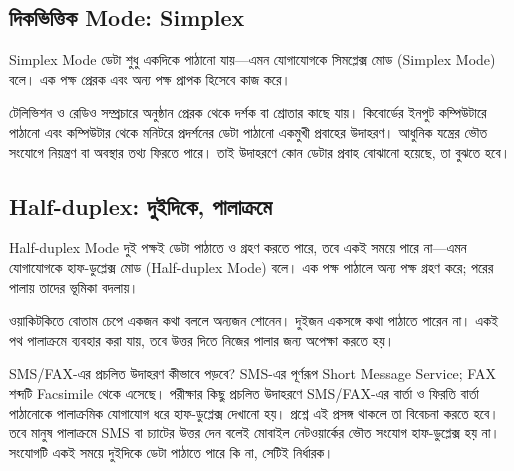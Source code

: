 \subsection{দিকভিত্তিক Mode: Simplex}
\label{ch2:c02-08}
\begin{definitionbox}{Simplex Mode}
ডেটা শুধু একদিকে পাঠানো যায়—এমন যোগাযোগকে সিমপ্লেক্স মোড (Simplex Mode) বলে। এক পক্ষ প্রেরক এবং অন্য পক্ষ প্রাপক হিসেবে কাজ করে।
\end{definitionbox}
টেলিভিশন ও রেডিও সম্প্রচারে অনুষ্ঠান প্রেরক থেকে দর্শক বা শ্রোতার কাছে যায়। কিবোর্ডের ইনপুট কম্পিউটারে পাঠানো এবং কম্পিউটার থেকে মনিটরে প্রদর্শনের ডেটা পাঠানো একমুখী প্রবাহের উদাহরণ। আধুনিক যন্ত্রের ভৌত সংযোগে নিয়ন্ত্রণ বা অবস্থার তথ্য ফিরতে পারে। তাই উদাহরণে কোন ডেটার প্রবাহ বোঝানো হয়েছে, তা বুঝতে হবে।

\subsection{Half-duplex: দুইদিকে, পালাক্রমে}
\label{ch2:c02-09}
\begin{definitionbox}{Half-duplex Mode}
দুই পক্ষই ডেটা পাঠাতে ও গ্রহণ করতে পারে, তবে একই সময়ে পারে না—এমন যোগাযোগকে হাফ-ডুপ্লেক্স মোড (Half-duplex Mode) বলে। এক পক্ষ পাঠালে অন্য পক্ষ গ্রহণ করে; পরের পালায় তাদের ভূমিকা বদলায়।
\end{definitionbox}
ওয়াকিটকিতে বোতাম চেপে একজন কথা বললে অন্যজন শোনেন। দুইজন একসঙ্গে কথা পাঠাতে পারেন না। একই পথ পালাক্রমে ব্যবহার করা যায়, তবে উত্তর দিতে নিজের পালার জন্য অপেক্ষা করতে হয়।
\begin{boardbox}{SMS/FAX-এর প্রচলিত উদাহরণ কীভাবে পড়বে?}
SMS-এর পূর্ণরূপ Short Message Service; FAX শব্দটি Facsimile থেকে এসেছে। পরীক্ষার কিছু প্রচলিত উদাহরণে SMS/FAX-এর বার্তা ও ফিরতি বার্তা পাঠানোকে পালাক্রমিক যোগাযোগ ধরে হাফ-ডুপ্লেক্স দেখানো হয়। প্রশ্নে এই প্রসঙ্গ থাকলে তা বিবেচনা করতে হবে। তবে মানুষ পালাক্রমে SMS বা চ্যাটের উত্তর দেন বলেই মোবাইল নেটওয়ার্কের ভৌত সংযোগ হাফ-ডুপ্লেক্স হয় না। সংযোগটি একই সময়ে দুইদিকে ডেটা পাঠাতে পারে কি না, সেটিই নির্ধারক।
\end{boardbox}

